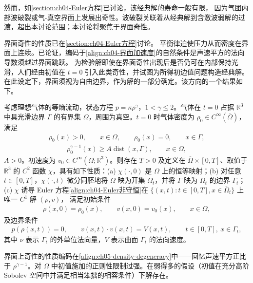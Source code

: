\documentclass[../../main.tex]{subfiles}
\begin{document}
然而，如\cref{section:ch04-Euler方程}已讨论，该经典解的寿命一般有限，
因为气团内部波破裂或气-真空界面上发展出奇性。波破裂关联着从经典解到含激波弱解的过渡，超出本讨论范围；本讨论将聚焦于界面奇性。

界面奇性的性质已在\cref{section:ch04-Euler方程}讨论。
平衡律迫使压力从而密度在界面上连续。已论证，编码于\eqref{align:ch04-界面加速度}的自然条件是声速平方的法向导数须越过界面跳跃。
为检验解即使在界面奇性出现后是否仍可在内部保持光滑，人们经由初值在 $t=0$ 引入此类奇性，并试图为所得初边值问题构造经典解。在此设定下，界面须视为自由边界，作为解的一部分确定。该方向的一个结果如下。

\begin{theorem}\label{theorem:ch05-vacuum}
考虑理想气体的等熵流动，状态方程 $p=\kappa\rho^{\gamma}$，$1<\gamma\leqslant2$。气体在 $t=0$ 占据 $\mathbb{R}^{3}$ 中具光滑边界 $\Gamma$ 的有界集 $\Omega$，周围为真空。$t=0$ 时气体密度为 $\rho_{0}\in C^{\infty}(\overline{\Omega})$，满足
\begin{align}
\rho_{0}(x)>0,\qquad x\in\Omega,\qquad\rho_{0}(x)=0,\qquad x\in\Gamma,\label{align:ch05-density-data}
\end{align}
\begin{align}
\rho_{0}^{\gamma-1}(x)\geqslant A\operatorname{dist}(x,\Gamma),\qquad x\in\Omega,\label{align:ch05-density-degeneracy}
\end{align}
$A>0$。初速度为 $v_{0}\in C^{\infty}(\Omega;\mathbb{R}^{3})$。则存在 $T>0$ 及定义在 $\overline{\Omega}\times[0,T]$、取值于 $\mathbb{R}^{3}$ 的 $C^{2}$ 函数 $\chi$，具有如下性质：(a) $\chi(\cdot,0)$ 是 $\Omega$ 上的恒等映射；(b) 对任意 $t\in[0,T]$，$\chi(\cdot,t)$ 微分同胚地将 $\Omega$ 映为开集 $\Omega_{t}$，并将 $\Gamma$ 映为 $\Omega_{t}$ 的边界 $\Gamma_{t}$；(c) $\chi$ 诱导 Euler 方程\eqref{align:ch04-Euler非守恒}在 $\{(x,t):t\in[0,T],x\in\overline{\Omega}_{t}\}$ 上唯一 $C^{1}$ 解 $(\rho,v)$，
满足初始条件
\begin{align}
\rho(x,0)=\rho_{0}(x),\qquad v(x,0)=v_{0}(x),\qquad x\in\Omega,\label{align:ch05-vacuum-initial}
\end{align}
及边界条件
\begin{align}
p(\rho(x,t))=0,\qquad v(x,t)\cdot v(x,t)=V(x,t),\qquad t\in[0,T],\ x\in\Gamma_{t},\label{align:ch05-vacuum-boundary}
\end{align}
其中 $\nu$ 表示 $\Gamma_{t}$ 的外单位法向量，$V$ 表示曲面 $\Gamma_{t}$ 的法向速度。
\end{theorem}

界面上奇性的性质编码在\eqref{align:ch05-density-degeneracy}中——回忆声速平方正比于 $\rho^{\gamma-1}$。对 $\Omega$ 中初值施加的正则性限制过强。在弱得多的假设（初值在充分高阶 Sobolev 空间中并满足相当笨拙的相容条件）下解存在。
\end{document}
